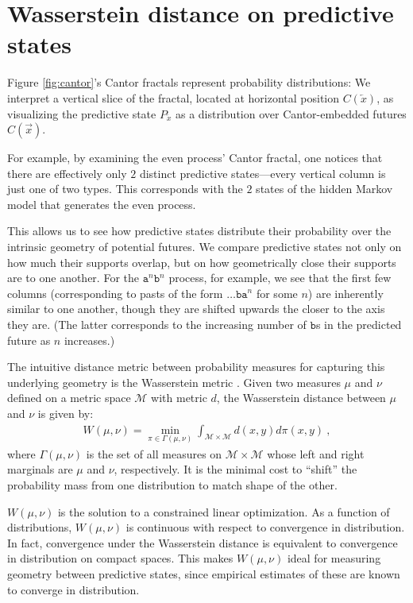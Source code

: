 \documentclass[draft,aps,pre,twocolumn,groupaddress,showkeys,nofootinbib,preprintnumbers,floatfix]{revtex4-2}
\begin{document}
\section{Wasserstein distance on predictive states}

Figure \ref{fig:cantor}'s Cantor fractals represent probability distributions:
We interpret a vertical slice of the fractal, located at horizontal position
$C(\overleftarrow{x})$, as visualizing the predictive state
$P_{\overleftarrow{x}}$ as a distribution over Cantor-embedded futures
$C(\overrightarrow{x})$.

For example, by examining the even process' Cantor fractal, one notices that
there are effectively only $2$ distinct predictive states---every vertical
column is just one of two types. This corresponds with the $2$ states of the
hidden Markov model that generates the even process.

This allows us to see how predictive states distribute their probability over
the intrinsic geometry of potential futures. We compare predictive states not
only on how much their supports overlap, but on how geometrically close their
supports are to one another. For the $\mathtt{a}^n \mathtt{b}^n$ process, for
example, we see that the first few columns (corresponding to pasts of the form
$\dots \mathtt{b a}^n$ for some $n$) are inherently similar to one another,
though they are shifted upwards the closer to the axis they are. (The latter
corresponds to the increasing number of $\mathtt{b}$s in the predicted future
as $n$ increases.)

The intuitive distance metric between probability measures for capturing this
underlying geometry is the Wasserstein metric \cite{Pane19a}. Given two measures
$\mu$ and $\nu$ defined on a metric space $\mathcal{M}$ with metric $d$, the
Wasserstein distance between $\mu$ and $\nu$ is given by:
\begin{align*}
  W(\mu,\nu) = \min_{\pi\in \Gamma(\mu,\nu)}
   \int_{\mathcal{M}\times\mathcal{M}} 
   d(x,y) d\pi(x,y)
   ~,
\end{align*}
where $\Gamma(\mu,\nu)$ is the set of all measures on $\mathcal{M} \times
\mathcal{M}$ whose left and right marginals are $\mu$ and $\nu$, respectively.
It is the minimal cost to ``shift'' the probability mass from one distribution
to match shape of the other. 

$W(\mu,\nu)$ is the solution to a constrained linear optimization. As a
function of distributions, $W(\mu,\nu)$ is continuous with respect to
convergence in distribution. In fact, convergence under the Wasserstein
distance is equivalent to convergence in distribution on compact spaces. This
makes $W(\mu,\nu)$ ideal for measuring geometry between predictive states,
since empirical estimates of these are known to converge in distribution.
\end{document}
